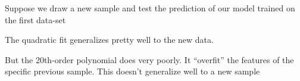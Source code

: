 \documentclass[11pt,english,handout]{beamer}
\newenvironment{wideitemize}{\itemize\addtolength{\itemsep}{10pt}}{\enditemize}
\begin{document}
\begin{frame}
	
	
	
	\begin{wideitemize}
		\item<1->
		Suppose we draw a new sample and test the prediction of our model trained on the first data-set
		
		\pause
		\item
		The quadratic fit generalizes pretty well to the new data.
		
		\item
		But the 20th-order polynomial does very poorly. It ``overfit'' the features of the specific previous sample. This doesn't generalize well to a new sample
		
	\end{wideitemize}
\end{frame}	
\end{document}
